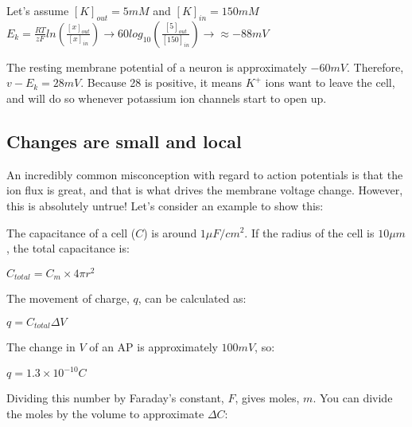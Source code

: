 \documentclass[12pt]{amsart}
\begin{document}
\bigskip
\begin{center}

    Let's assume $[K]_{out} = 5mM$ and $[K]_{in} = 150mM$\\
    \smallskip
    $E_k = \frac{RT}{zF}ln(\frac{[x]_{out}}{[x]_{in}}) \rightarrow 60log_{10}(\frac{[5]_{out}}{[150]_{in}}) \rightarrow \approx -88 mV$\\
    \smallskip
    
\end{center}

\bigskip

 The resting membrane potential of a neuron is approximately $-60mV$. Therefore, $v - E_k = 28mV$. Because 28 is positive, it means $K^+$ ions want to leave the cell, and will do so whenever potassium ion channels start to open up.  

\subsection{Changes are small and local} An incredibly common misconception with regard to action potentials is that the ion flux is great, and that is what drives the membrane voltage change. However, this is absolutely untrue! Let's consider an example to show this: 

\bigskip


    The capacitance of a cell ($C$) is around $1\mu F/cm^2$. If the radius of the cell is $10\mu m$, the total capacitance is:

\begin{center}

    $C_{total} = C_m \times 4\pi r^2$

\end{center}

    The movement of charge, $q$, can be calculated as:
    
\begin{center}

    $q = C_{total}\Delta V$

\end{center}

    The change in $V$ of an AP is approximately $100mV$, so:

\begin{center}

    $q = 1.3 \times 10^{-10}C$

\end{center}

    Dividing this number by Faraday's constant, $F$, gives moles, $m$. You can divide the moles by the volume to approximate $\Delta C$:
\end{document}
